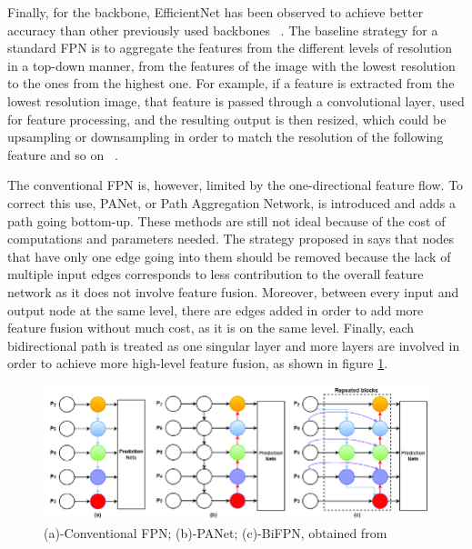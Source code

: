 Finally, for the backbone, EfficientNet has been observed to achieve better accuracy than other previously used backbones ~\cite{carte8}. 
The baseline strategy for a standard FPN is to aggregate the features from the different levels of resolution in a top-down manner, from the features of the image with the lowest resolution to the ones from the highest one. For example, if a feature is extracted from the lowest resolution image, that feature is passed through a convolutional layer, used for feature processing, and the resulting output is then resized, which could be upsampling or downsampling in order to match the resolution of the following feature and so on ~\cite{carte8}.

The conventional FPN is, however, limited by the one-directional feature flow. To correct this use, PANet, or Path Aggregation Network, is introduced and adds a path going bottom-up. These methods are still not ideal because of the cost of computations and parameters needed. The strategy proposed in \cite{carte8} says that nodes that have only one edge going into them should be removed because the lack of multiple input edges corresponds to less contribution to the overall feature network as it does not involve feature fusion. Moreover, between every input and output node at the same level, there are edges added in order to add more feature fusion without much cost, as it is on the same level. Finally, each bidirectional path is treated as one singular layer and more layers are involved in order to achieve more high-level feature fusion, as shown in figure \ref{fig:fig6}.

\begin{figure}[!ht]
    \centering
    \includegraphics[width=1\textwidth]{figures/Figure6.png}
    \caption{(a)-Conventional FPN; (b)-PANet; (c)-BiFPN, obtained from ~\cite{link14}}
    \label{fig:fig6}
\end{figure}

